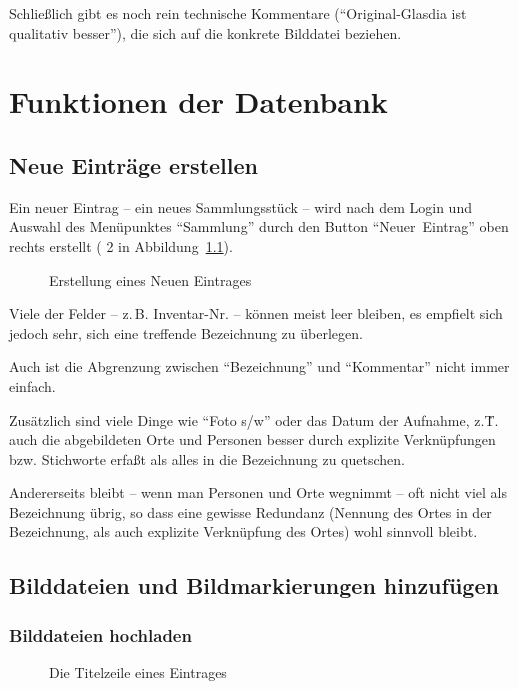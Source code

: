 \documentclass[12pt]{scrreprt}
\begin{document}
Schließlich gibt es noch rein technische Kommentare
(``Original-Glasdia ist qualitativ besser''), die sich auf die
konkrete Bilddatei beziehen. 


\chapter{Funktionen der Datenbank}
\section{Neue Einträge erstellen}

Ein neuer Eintrag -- ein neues Sammlungsstück -- wird nach dem Login und
Auswahl des Menüpunktes ``Sammlung'' durch den Button ``Neuer~Eintrag''
oben rechts erstellt ({\color{red} 2} in Abbildung~\ref{neuer-eintrag}).

\begin{figure}
  \caption{\label{neuer-eintrag} Erstellung eines Neuen Eintrages}
\end{figure}

Viele der Felder -- z.\,B. Inventar-Nr. -- können meist leer bleiben,
es empfielt sich jedoch sehr, sich eine treffende Bezeichnung zu überlegen.

Auch ist die Abgrenzung zwischen ``Bezeichnung'' und ``Kommentar''
nicht immer einfach.

Zusätzlich sind viele Dinge wie ``Foto s/w'' oder das Datum der Aufnahme,
z.\.T. auch die abgebildeten Orte und Personen besser durch explizite
Verknüpfungen bzw. Stichworte erfaßt als alles in die Bezeichnung zu quetschen.

Andererseits bleibt -- wenn man Personen und Orte wegnimmt -- oft
nicht viel als Bezeichnung übrig, so dass eine gewisse Redundanz
(Nennung des Ortes in der Bezeichnung, als auch explizite Verknüpfung
des Ortes) wohl sinnvoll bleibt.


\section{Bilddateien und Bildmarkierungen hinzufügen}

\subsection{Bilddateien hochladen}

\begin{figure}
  \caption{\label{eintrag-menu} Die Titelzeile eines Eintrages}
\end{figure}
\end{document}

